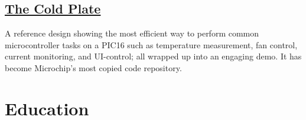 \documentclass[
	10pt, %
]{FreemanCV}
\begin{document}
\begin{paracol}{2}
\vspace*{-10pt}
\leavevmode \subsection{\href{https://github.com/microchip-pic-avr-examples/pic16f17146-cold-plate-mplab-mcc}{The Cold Plate \scriptsize\faLink}}

A reference design showing the most efficient way to perform common microcontroller tasks on a PIC16
such as temperature measurement, fan control, current monitoring, and UI-control;
all wrapped up into an engaging demo.
It has become Microchip's most copied code repository.





\section{Education} 




\begin{supertabular}{r l} %


\end{supertabular}
\end{paracol}
\end{document}
